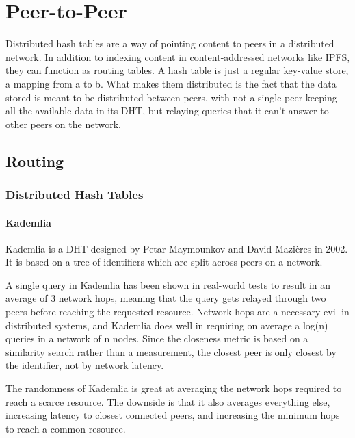 \chapter{Peer-to-Peer}
\label{Peer-to-Peer}
Distributed hash tables are a way of pointing content to peers in a distributed network. In addition to indexing content in content-addressed networks like IPFS, they can function as routing tables. A hash table is just a regular key-value store, a mapping from a to b. What makes them distributed is the fact that the data stored is meant to be distributed between peers, with not a single peer keeping all the available data in its DHT, but relaying queries that it can't answer to other peers on the network.
						
\section{Routing}
						
						
\subsection{Distributed Hash Tables}
						
\subsubsection{Kademlia}
Kademlia is a DHT designed by Petar Maymounkov and David Mazières in 2002. It is based on a tree of identifiers which are split across peers on a network.
						
A single query in Kademlia has been shown in real-world tests to result in an average of 3 network hops, meaning that the query gets relayed through two peers before reaching the requested resource.\cite{Roos2013-mb} Network hops are a necessary evil in distributed systems, and Kademlia does well in requiring on average a log(n) queries in a network of n nodes. Since the closeness metric is based on a similarity search rather than a measurement, the closest peer is only closest by the identifier, not by network latency.
						
The randomness of Kademlia is great at averaging the network hops required to reach a scarce resource. The downside is that it also averages everything else, increasing latency to closest connected peers, and increasing the minimum hops to reach a common resource.
